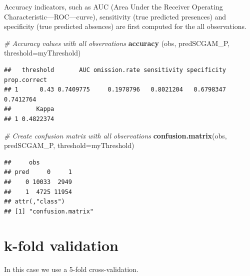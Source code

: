 \documentclass[
]{book}
\newenvironment{Shaded}{\begin{snugshade}}{\end{snugshade}}
\newcommand{\AttributeTok}[1]{\textcolor[rgb]{0.13,0.29,0.53}{#1}}
\newcommand{\CommentTok}[1]{\textcolor[rgb]{0.56,0.35,0.01}{\textit{#1}}}
\newcommand{\DecValTok}[1]{\textcolor[rgb]{0.00,0.00,0.81}{#1}}
\newcommand{\FunctionTok}[1]{\textcolor[rgb]{0.13,0.29,0.53}{\textbf{#1}}}
\newcommand{\NormalTok}[1]{#1}
\newcommand{\OtherTok}[1]{\textcolor[rgb]{0.56,0.35,0.01}{#1}}
\newcommand{\SpecialCharTok}[1]{\textcolor[rgb]{0.81,0.36,0.00}{\textbf{#1}}}
\begin{document}
Accuracy indicators, such as AUC (Area Under the Receiver Operating Characteristic---ROC---curve), sensitivity (true predicted presences) and specificity (true predicted absences) are first computed for the all observations.

\begin{Shaded}
\begin{Highlighting}[]
\CommentTok{\# Accuracy values with all observations}
\FunctionTok{accuracy}\NormalTok{ (obs, predSCGAM\_P, }\AttributeTok{threshold=}\NormalTok{myThreshold)}
\end{Highlighting}
\end{Shaded}

\begin{verbatim}
##   threshold       AUC omission.rate sensitivity specificity prop.correct
## 1      0.43 0.7409775     0.1978796   0.8021204   0.6798347    0.7412764
##       Kappa
## 1 0.4822374
\end{verbatim}

\begin{Shaded}
\begin{Highlighting}[]
\CommentTok{\# Create confusion matrix with all observations}
\FunctionTok{confusion.matrix}\NormalTok{(obs, predSCGAM\_P, }\AttributeTok{threshold=}\NormalTok{myThreshold)}
\end{Highlighting}
\end{Shaded}

\begin{verbatim}
##     obs
## pred     0     1
##    0 10033  2949
##    1  4725 11954
## attr(,"class")
## [1] "confusion.matrix"
\end{verbatim}

\section{k-fold validation}\label{k-fold-validation}

In this case we use a 5-fold cross-validation.

\begin{Shaded}
\end{Shaded}
\end{document}
